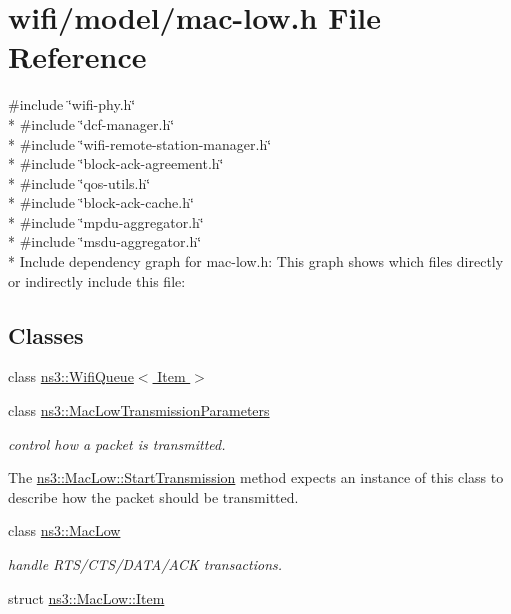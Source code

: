 \hypertarget{mac-low_8h}{}\section{wifi/model/mac-\/low.h File Reference}
\label{mac-low_8h}
{\ttfamily \#include \char`\"{}wifi-\/phy.\+h\char`\"{}}\\*
{\ttfamily \#include \char`\"{}dcf-\/manager.\+h\char`\"{}}\\*
{\ttfamily \#include \char`\"{}wifi-\/remote-\/station-\/manager.\+h\char`\"{}}\\*
{\ttfamily \#include \char`\"{}block-\/ack-\/agreement.\+h\char`\"{}}\\*
{\ttfamily \#include \char`\"{}qos-\/utils.\+h\char`\"{}}\\*
{\ttfamily \#include \char`\"{}block-\/ack-\/cache.\+h\char`\"{}}\\*
{\ttfamily \#include \char`\"{}mpdu-\/aggregator.\+h\char`\"{}}\\*
{\ttfamily \#include \char`\"{}msdu-\/aggregator.\+h\char`\"{}}\\*
Include dependency graph for mac-\/low.h\+:
This graph shows which files directly or indirectly include this file\+:
\subsection*{Classes}
\begin{DoxyCompactItemize}
\item 
class \hyperlink{classns3_1_1WifiQueue}{ns3\+::\+Wifi\+Queue$<$ Item $>$}
\item 
class \hyperlink{classns3_1_1MacLowTransmissionParameters}{ns3\+::\+Mac\+Low\+Transmission\+Parameters}
\begin{DoxyCompactList}\small\item\em control how a packet is transmitted.

The \hyperlink{classns3_1_1MacLow_a3d13643c758e213041f8389c1041074b}{ns3\+::\+Mac\+Low\+::\+Start\+Transmission} method expects an instance of this class to describe how the packet should be transmitted. \end{DoxyCompactList}\item 
class \hyperlink{classns3_1_1MacLow}{ns3\+::\+Mac\+Low}
\begin{DoxyCompactList}\small\item\em handle R\+T\+S/\+C\+T\+S/\+D\+A\+T\+A/\+A\+CK transactions. \end{DoxyCompactList}\item 
struct \hyperlink{structns3_1_1MacLow_1_1Item}{ns3\+::\+Mac\+Low\+::\+Item}
\end{DoxyCompactItemize}
